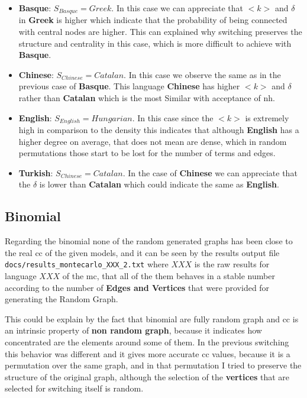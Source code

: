 \documentclass[12pt, a4paper]{article}
\begin{document}
\begin{itemize}
    \item \textbf{Basque}: $S_{Basque} = Greek$. In this case we can appreciate that $<k>$ and $\delta$ in \textbf{Greek} is higher which indicate that the probability of being connected with central nodes are higher. 
    This can explained why \acrshort{switching} preserves the structure and centrality in this case, which is more difficult to achieve with \textbf{Basque}.
    \item \textbf{Chinese}: $S_{Chinese} = Catalan$. In this case we observe the same as in the previous case of \textbf{Basque}. This language \textbf{Chinese} has higher $<k>$ and $\delta$ rather than \textbf{Catalan}
    which is the most Similar with acceptance of \acrshort{nh}. 
    \item \textbf{English}: $S_{English} = Hungarian$. In this case since the $<k>$ is extremely high in comparison to the density this indicates that although \textbf{English} has a higher degree on average, that does not
    mean are dense, which in random permutations those start to be lost for the number of terms and edges.
    \item \textbf{Turkish}: $S_{Chinese} = Catalan$. In the case of \textbf{Chinese} we can appreciate that the $\delta$ is lower than \textbf{Catalan} which could indicate the same as \textbf{English}.
\end{itemize}
 

\subsection{Binomial}
Regarding the \acrshort{binomial} none of the random generated graphs has been close to the real \acrshort{cc} of the given models,
and it can be seen by the results output file \texttt{docs/results_montecarlo_XXX_2.txt} where $XXX$ is the raw results for language $XXX$ of the \acrshort{mc}, 
that all of the them behaves in a stable number according to the number of \textbf{Edges and Vertices} that were provided for generating the Random Graph.

This could be explain by the fact that \acrshort{binomial} are fully random graph and \acrshort{cc} is an intrinsic property of \textbf{non random graph}, because it indicates how concentrated 
are the elements around some of them. In the previous \acrshort{switching} this behavior was different and it gives more accurate \acrshort{cc} values, because it is a permutation
over the same graph, and in that permutation I tried to preserve the structure of the original graph, although the selection of the \textbf{vertices} that are selected for switching itself is random.
\end{document}
